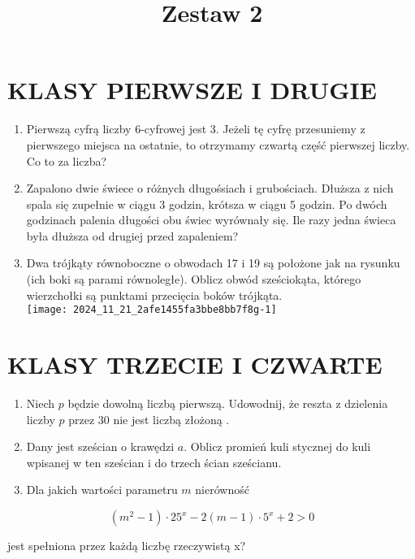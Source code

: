 \documentclass[10pt]{article}
\title{Zestaw 2 }
\author{}
\date{}
\begin{document}
\maketitle
\section*{KLASY PIERWSZE I DRUGIE}
\begin{enumerate}
  \item Pierwszą cyfrą liczby 6-cyfrowej jest 3. Jeżeli tę cyfrę przesuniemy z pierwszego miejsca na ostatnie, to otrzymamy czwartą część pierwszej liczby. Co to za liczba?
  \item Zapalono dwie świece o różnych długośsiach i grubościach. Dłuższa z nich spala się zupełnie w ciągu 3 godzin, krótsza w ciągu 5 godzin. Po dwóch godzinach palenia długości obu świec wyrównały się. Ile razy jedna świeca była dłuższa od drugiej przed zapaleniem?
  \item Dwa trójkąty równoboczne o obwodach 17 i 19 są położone jak na rysunku (ich boki są parami równoległe). Oblicz obwód sześciokąta, którego wierzchołki są punktami przecięcia boków trójkąta.\\
\texttt{[image: 2024\_11\_21\_2afe1455fa3bbe8bb7f8g-1]}
\end{enumerate}

\section*{KLASY TRZECIE I CZWARTE}
\begin{enumerate}
  \item Niech \(p\) będzie dowolną liczbą pierwszą. Udowodnij, że reszta z dzielenia liczby \(p\) przez 30 nie jest liczbą złożoną .
  \item Dany jest sześcian o krawędzi \(a\). Oblicz promień kuli stycznej do kuli wpisanej w ten sześcian i do trzech ścian sześcianu.
  \item Dla jakich wartości parametru \(m\) nierówność
\end{enumerate}

\[
\left(m^{2}-1\right) \cdot 25^{x}-2(m-1) \cdot 5^{x}+2>0
\]

jest spełniona przez każdą liczbę rzeczywistą x?
\end{document}
